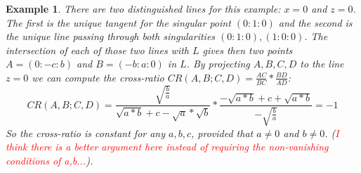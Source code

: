 \documentclass{article}
\newtheorem{example}{Example}[section]
\begin{document}
\begin{example}
There are two distinguished lines for this example: $x = 0$ and $z = 0$. The first is the unique tangent for the singular point $(0:1:0)$ and the second is the unique line passing through both singularities $(0:1:0),(1:0:0)$. The intersection of each of those two lines with $L$ gives then two points $A = (0:-c:b)$ and $B = (-b:a:0)$ in $L$. By projecting $A,B,C,D$ to the line $z=0$ we can compute the cross-ratio $CR(A,B;C,D) = \frac{AC}{BC}*\frac{BD}{AD}$:
\begin{equation}
    CR(A,B;C,D) = \frac{\sqrt{\frac{b}{a}}}{\sqrt{a*b}+c-\sqrt{a}*\sqrt{b}}*\frac{-\sqrt{a*b}+c+\sqrt{a*b}}{-\sqrt{\frac{b}{a}}} = -1
\end{equation}
So the cross-ratio is constant for any $a,b,c$, provided that $a \not = 0$ and $b \not = 0$. (\textcolor{red}{I think there is a better argument here instead of requiring the non-vanishing conditions of a,b...}).
\end{example}
\end{document}
